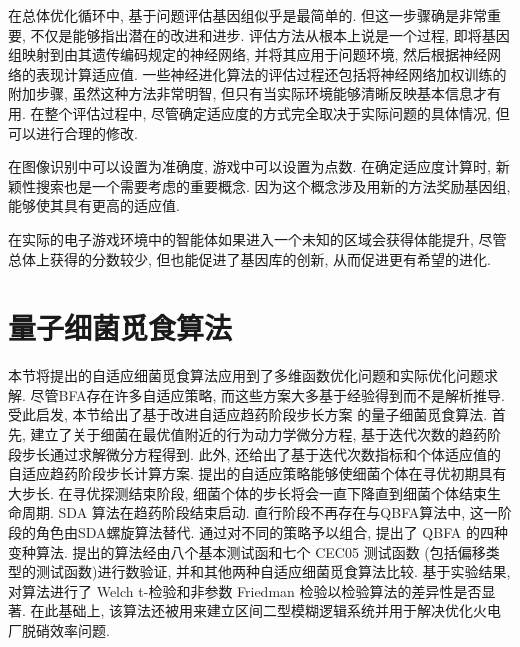 在总体优化循环中, 基于问题评估基因组似乎是最简单的. 但这一步骤确是非常重要, 不仅是能够指出潜在的改进和进步.
评估方法从根本上说是一个过程, 即将基因组映射到由其遗传编码规定的神经网络, 并将其应用于问题环境, 然后根据神经网络的表现计算适应值.
一些神经进化算法的评估过程还包括将神经网络加权训练的附加步骤, 虽然这种方法非常明智, 但只有当实际环境能够清晰反映基本信息才有用.
在整个评估过程中, 尽管确定适应度的方式完全取决于实际问题的具体情况, 但可以进行合理的修改.
\begin{example}
    在图像识别中可以设置为准确度, 游戏中可以设置为点数. 在确定适应度计算时, 新颖性搜索也是一个需要考虑的重要概念.
    因为这个概念涉及用新的方法奖励基因组, 能够使其具有更高的适应值.
\end{example}
\begin{example}
    在实际的电子游戏环境中的智能体如果进入一个未知的区域会获得体能提升, 尽管总体上获得的分数较少, 但也能促进了基因库的创新, 从而促进更有希望的进化.
\end{example}
\section{量子细菌觅食算法}
本节将提出的自适应细菌觅食算法应用到了多维函数优化问题和实际优化问题求解. 尽管BFA存在许多自适应策略, 而这些方案大多基于经验得到而不是解析推导.
受此启发, 本节给出了基于改进自适应趋药阶段步长方案 的量子细菌觅食算法.
首先, 建立了关于细菌在最优值附近的行为动力学微分方程, 基于迭代次数的趋药阶段步长通过求解微分方程得到.
此外, 还给出了基于迭代次数指标和个体适应值的自适应趋药阶段步长计算方案.
提出的自适应策略能够使细菌个体在寻优初期具有大步长. 在寻优探测结束阶段, 细菌个体的步长将会一直下降直到细菌个体结束生命周期.
SDA 算法在趋药阶段结束启动. 直行阶段不再存在与QBFA算法中, 这一阶段的角色由SDA螺旋算法替代.
通过对不同的策略予以组合, 提出了 QBFA 的四种变种算法.
提出的算法经由八个基本测试函和七个  CEC05 测试函数 (包括偏移类型的测试函数)进行数验证, 并和其他两种自适应细菌觅食算法比较.
基于实验结果, 对算法进行了 Welch t-检验和非参数 Friedman 检验以检验算法的差异性是否显著.
在此基础上, 该算法还被用来建立区间二型模糊逻辑系统并用于解决优化火电厂脱硝效率问题.
